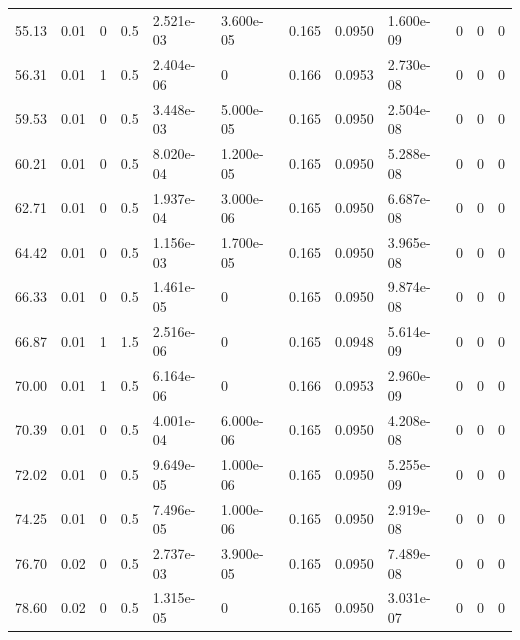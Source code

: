 \documentclass[preview]{standalone}
\begin{document}
{{\begin{tabular}{L{1.2cm}C{1.2cm} C{0.3cm}C{0.5cm} C{1.4cm}C{1.4cm} C{1.4cm}C{1.4cm} C{1.6cm}C{1.6cm} C{1.6cm}C{1.6cm}}
  55.13  &  0.01  & 0     & 0.5 &  2.521e-03  & 3.600e-05  &  0.165&   0.0950& 1.600e-09 & 0   &  0 & 0  \\ 
  56.31  &  0.01  & 1     & 0.5 &  2.404e-06  & 0  &  0.166&   0.0953& 2.730e-08 & 0   &  0 & 0  \\ 
  59.53  &  0.01  & 0     & 0.5 &  3.448e-03  & 5.000e-05  &  0.165&   0.0950& 2.504e-08 & 0   &  0 & 0  \\ 
  60.21  &  0.01  & 0     & 0.5 &  8.020e-04  & 1.200e-05  &  0.165&   0.0950& 5.288e-08 & 0   &  0 & 0  \\ 
  62.71  &  0.01  & 0     & 0.5 &  1.937e-04  & 3.000e-06  &  0.165&   0.0950& 6.687e-08 & 0   &  0 & 0  \\ 
  64.42  &  0.01  & 0     & 0.5 &  1.156e-03  & 1.700e-05  &  0.165&   0.0950& 3.965e-08 & 0   &  0 & 0  \\ 
  66.33  &  0.01  & 0     & 0.5 &  1.461e-05  & 0  &  0.165&   0.0950& 9.874e-08 & 0   &  0 & 0  \\ 
  66.87  &  0.01  & 1     & 1.5 &  2.516e-06  & 0  &  0.165&   0.0948& 5.614e-09 & 0   &  0 & 0  \\ 
  70.00  &  0.01  & 1     & 0.5 &  6.164e-06  & 0  &  0.166&   0.0953& 2.960e-09 & 0   &  0 & 0  \\ 
  70.39  &  0.01  & 0     & 0.5 &  4.001e-04  & 6.000e-06  &  0.165&   0.0950& 4.208e-08 & 0   &  0 & 0  \\ 
  72.02  &  0.01  & 0     & 0.5 &  9.649e-05  & 1.000e-06  &  0.165&   0.0950& 5.255e-09 & 0   &  0 & 0  \\ 
  74.25  &  0.01  & 0     & 0.5 &  7.496e-05  & 1.000e-06  &  0.165&   0.0950& 2.919e-08 & 0   &  0 & 0  \\ 
  76.70  &  0.02  & 0     & 0.5 &  2.737e-03  & 3.900e-05  &  0.165&   0.0950& 7.489e-08 & 0   &  0 & 0  \\ 
  78.60  &  0.02  & 0     & 0.5 &  1.315e-05  & 0  &  0.165&   0.0950& 3.031e-07 & 0   &  0 & 0  \\ 
\hline 
\end{tabular} 

}}
\end{document}
